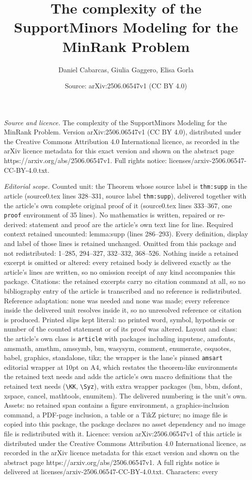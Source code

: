\documentclass[10pt,a4paper]{amsart}
\title[The complexity of the SupportMinors Modeling for the MinRank]{The complexity of the SupportMinors Modeling for the MinRank Problem}
\author{Daniel Cabarcas, Giulia Gaggero, Elisa Gorla}
\date{Source: arXiv:2506.06547v1 (CC BY 4.0)}
\begin{document}
\maketitle

\noindent\emph{Source and licence.} The complexity of the SupportMinors Modeling for the MinRank Problem. Version arXiv:2506.06547v1 (CC BY 4.0), distributed under the Creative Commons Attribution 4.0 International licence, as recorded in the arXiv licence metadata for this exact version and shown on the abstract page https://arxiv.org/abs/2506.06547v1. Full rights notice: licenses/arxiv-2506.06547-CC-BY-4.0.txt.\par\smallskip

\noindent\textit{Editorial scope.} Counted unit: the Theorem whose source label is \texttt{thm:supp} in the article (source0.tex lines 328--331, source label \texttt{thm:supp}), delivered together with the article's own complete original proof of it (source0.tex lines 333--367, one \texttt{proof} environment of 35 lines). No mathematics is written, repaired or re-derived: statement and proof are the article's own text line for line. Required context retained uncounted: lemma:supp (lines 286--293). Every definition, display and label of those lines is retained unchanged. Omitted from this package and not redistributed: 1--285, 294--327, 332--332, 368--526. Nothing inside a retained excerpt is omitted or altered: every retained body is delivered exactly as the article's lines are written, so no omission receipt of any kind accompanies this package. Citations: the retained excerpts carry no citation command at all, so no bibliography entry of the article is transcribed and no reference is redistributed. Reference adaptation: none was needed and none was made; every reference inside the delivered unit resolves inside it, so no unresolved reference or citation is produced. Printed slips kept literal: no printed word, symbol, hypothesis or number of the counted statement or of its proof was altered. Layout and class: the article's own class is \texttt{article} with packages including inputenc, amsfonts, amsmath, amsthm, amssymb, bm, wasysym, comment, enumerate, csquotes, babel, graphics, standalone, tikz; the wrapper is the lane's pinned \texttt{amsart} editorial wrapper at 10pt on A4, which restates the theorem-like environments the retained text needs and adds the article's own macro definitions that the retained text needs (\texttt{\textbackslash KK}, \texttt{\textbackslash Syz}), with extra wrapper packages (bm, bbm, dsfont, xspace, cancel, mathtools, enumitem). The delivered numbering is the unit's own. Assets: no retained span contains a figure environment, a graphics-inclusion command, a PDF-page inclusion, a table or a TikZ picture; no image file is copied into this package, the package declares no asset dependency and no image file is redistributed with it. Licence: version arXiv:2506.06547v1 of this article is distributed under the Creative Commons Attribution 4.0 International licence, as recorded in the arXiv licence metadata for this exact version and shown on the abstract page https://arxiv.org/abs/2506.06547v1. A full rights notice is delivered at licenses/arxiv-2506.06547-CC-BY-4.0.txt. Characters: every 
\end{document}
